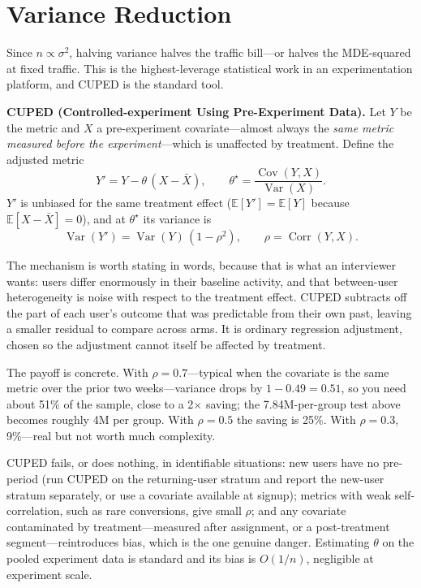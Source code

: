 \section{Variance Reduction}
\label{cml:sec:variance_reduction}

Since $n \propto \sigma^2$, halving variance halves the traffic bill---or halves the MDE-squared at fixed traffic. This is the highest-leverage statistical work in an experimentation platform, and CUPED is the standard tool.

\begin{mathresult}
\textbf{CUPED (Controlled-experiment Using Pre-Experiment Data).} Let $Y$ be the metric and $X$ a pre-experiment covariate---almost always the \emph{same metric measured before the experiment}---which is unaffected by treatment. Define the adjusted metric
\begin{equation*}
Y' = Y - \theta\,(X - \bar X), \qquad \theta^\star = \frac{\operatorname{Cov}(Y, X)}{\operatorname{Var}(X)}.
\end{equation*}
$Y'$ is unbiased for the same treatment effect ($\mathbb{E}[Y'] = \mathbb{E}[Y]$ because $\mathbb{E}[X - \bar X] = 0$), and at $\theta^\star$ its variance is
\begin{equation*}
\operatorname{Var}(Y') = \operatorname{Var}(Y)\,(1 - \rho^2), \qquad \rho = \operatorname{Corr}(Y, X).
\end{equation*}
\end{mathresult}

The mechanism is worth stating in words, because that is what an interviewer wants: users differ enormously in their baseline activity, and that between-user heterogeneity is noise with respect to the treatment effect. CUPED subtracts off the part of each user's outcome that was predictable from their own past, leaving a smaller residual to compare across arms. It is ordinary regression adjustment, chosen so the adjustment cannot itself be affected by treatment.

The payoff is concrete. With $\rho = 0.7$---typical when the covariate is the same metric over the prior two weeks---variance drops by $1 - 0.49 = 0.51$, so you need about 51\% of the sample, close to a 2$\times$ saving; the 7.84M-per-group test above becomes roughly 4M per group. With $\rho = 0.5$ the saving is 25\%. With $\rho = 0.3$, 9\%---real but not worth much complexity.

CUPED fails, or does nothing, in identifiable situations: new users have no pre-period (run CUPED on the returning-user stratum and report the new-user stratum separately, or use a covariate available at signup); metrics with weak self-correlation, such as rare conversions, give small $\rho$; and any covariate contaminated by treatment---measured after assignment, or a post-treatment segment---reintroduces bias, which is the one genuine danger. Estimating $\theta$ on the pooled experiment data is standard and its bias is $O(1/n)$, negligible at experiment scale.

